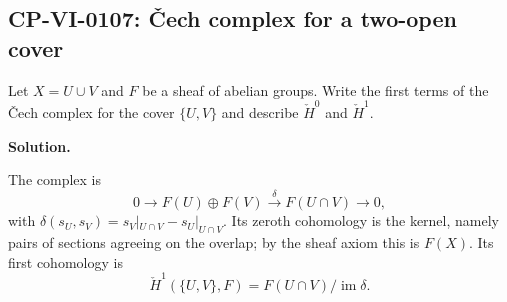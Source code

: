 
\subsection*{CP-VI-0107: Čech complex for a two-open cover}

Let $X=U\cup V$ and $F$ be a sheaf of abelian groups. Write the first terms of the Čech complex for the cover $\{U,V\}$ and describe $\check H^0$ and $\check H^1$.

\medskip
\noindent\textbf{Solution.}

The complex is
\[
0\to F(U)\oplus F(V)\xrightarrow{\delta}F(U\cap V)\to0,
\]
with $\delta(s_U,s_V)=s_V|_{U\cap V}-s_U|_{U\cap V}$. Its zeroth cohomology is the kernel, namely pairs of sections agreeing on the overlap; by the sheaf axiom this is $F(X)$. Its first cohomology is
\[
\check H^1(\{U,V\},F)=F(U\cap V)/\operatorname{im}\delta.
\]
